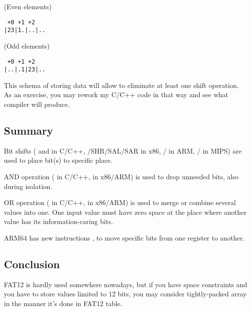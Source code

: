 (Even elements)

\begin{lstlisting}
 +0 +1 +2
|23|1.|..|..
\end{lstlisting}

(Odd elements)

\begin{lstlisting}
 +0 +1 +2
|..|.1|23|..
\end{lstlisting}

This schema of storing data will allow to eliminate at least one shift operation.
As an exercise, you may rework my C/C++ code in that way and see what compiler will produce.

\subsection{Summary}

Bit shifts (\TT{<<} and \TT{>>} in C/C++, /{SHR}/{SAL}/{SAR} in x86, / in ARM, / in MIPS) are used 
to place bit(s) to specific place.

AND operation (\TT{\&} in C/C++,  in x86/ARM) is used to drop unneeded bits, also during isolation.

OR operation (\TT{|} in C/C++,  in x86/ARM) is used to merge or combine several values into one.
One input value must have zero space at the place where another value has its information-caring bits.

ARM64 has new instructions ,  to move specific bits from one register to another.

\subsection{Conclusion}

FAT12 is hardly used somewhere nowadays, but if you have space constraints and you have to store values limited to 12 bits,
you may consider tightly-packed array in the manner it's done in FAT12 table.

